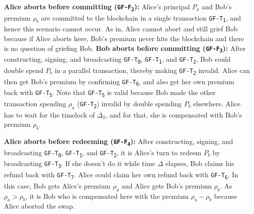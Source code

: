 \bigbreak
\noindent
\textbf{Alice aborts before committing  (\texttt{GF-F\textsubscript{2}}):}
Alice's principal $P_a$ and Bob's premium $\rho_b$ are committed to the blockchain in a single transaction \texttt{GF-T\textsubscript{1}}, and hence this scenario cannot occur. As in, Alice cannot abort and still grief Bob because if Alice aborts here, Bob's premium never hits the blockchain and there is no question of griefing Bob.
\bigbreak
\noindent
\textbf{Bob aborts before committing (\texttt{GF-F\textsubscript{3}}):}
After constructing, signing, and broadcasting \texttt{GF-T\textsubscript{0}}, \texttt{GF-T\textsubscript{1}}, and \texttt{GF-T\textsubscript{2}}, Bob could double spend $P_b$ in a parallel transaction, thereby making \texttt{GF-T\textsubscript{2}} invalid. Alice can then get Bob's premium by confirming \texttt{GF-T\textsubscript{6}}, and also get her own premium back with \texttt{GF-T\textsubscript{5}}. Note that \texttt{GF-T\textsubscript{5}} is valid because Bob made the other transaction spending $\rho_a$ (\texttt{GF-T\textsubscript{2}}) invalid by double spending $P_b$ elsewhere. Alice has to wait for the timelock of $\Delta_2$, and for that, she is compensated with Bob's premium $\rho_b$.

\bigbreak
\noindent
\textbf{Alice aborts before redeeming (\texttt{GF-F\textsubscript{4}}):}
After constructing, signing, and broadcasting \texttt{GF-T\textsubscript{0}}, \texttt{GF-T\textsubscript{1}}, and \texttt{GF-T\textsubscript{2}}, it is Alice's turn to redeem $P_b$ by broadcasting \texttt{GF-T\textsubscript{3}}. If she doesn't do it while time $\Delta$ elapses, Bob claims his refund back with \texttt{GF-T\textsubscript{7}}. Alice could claim her own refund back with \texttt{GF-T\textsubscript{6}}. In this case, Bob gets Alice's premium $\rho_a$ and Alice gets Bob's premium $\rho_b$. As $\rho_a > \rho_b$, it is Bob who is compensated here with the premium $\rho_a - \rho_b$ because Alice aborted the swap.

